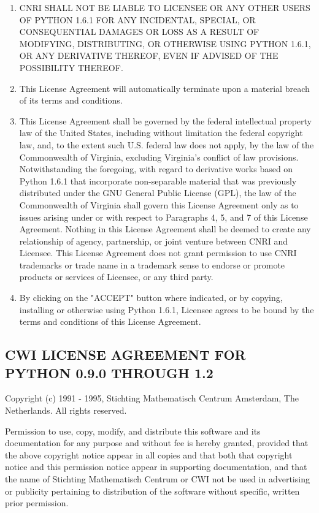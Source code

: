 \begin{enumerate}
\item CNRI SHALL NOT BE LIABLE TO LICENSEE OR ANY OTHER USERS OF PYTHON
1.6.1 FOR ANY INCIDENTAL, SPECIAL, OR CONSEQUENTIAL DAMAGES OR LOSS AS
A RESULT OF MODIFYING, DISTRIBUTING, OR OTHERWISE USING PYTHON 1.6.1,
OR ANY DERIVATIVE THEREOF, EVEN IF ADVISED OF THE POSSIBILITY THEREOF.

\item This License Agreement will automatically terminate upon a material
breach of its terms and conditions.

\item This License Agreement shall be governed by the federal
intellectual property law of the United States, including without
limitation the federal copyright law, and, to the extent such
U.S. federal law does not apply, by the law of the Commonwealth of
Virginia, excluding Virginia's conflict of law provisions.
Notwithstanding the foregoing, with regard to derivative works based
on Python 1.6.1 that incorporate non-separable material that was
previously distributed under the GNU General Public License (GPL), the
law of the Commonwealth of Virginia shall govern this License
Agreement only as to issues arising under or with respect to
Paragraphs 4, 5, and 7 of this License Agreement.  Nothing in this
License Agreement shall be deemed to create any relationship of
agency, partnership, or joint venture between CNRI and Licensee.  This
License Agreement does not grant permission to use CNRI trademarks or
trade name in a trademark sense to endorse or promote products or
services of Licensee, or any third party.

\item By clicking on the "ACCEPT" button where indicated, or by copying,
installing or otherwise using Python 1.6.1, Licensee agrees to be
bound by the terms and conditions of this License Agreement.

\end{enumerate}



\subsection{CWI LICENSE AGREEMENT FOR PYTHON 0.9.0 THROUGH 1.2}


Copyright (c) 1991 - 1995, Stichting Mathematisch Centrum Amsterdam,
The Netherlands.  All rights reserved.

Permission to use, copy, modify, and distribute this software and its
documentation for any purpose and without fee is hereby granted,
provided that the above copyright notice appear in all copies and that
both that copyright notice and this permission notice appear in
supporting documentation, and that the name of Stichting Mathematisch
Centrum or CWI not be used in advertising or publicity pertaining to
distribution of the software without specific, written prior
permission.


